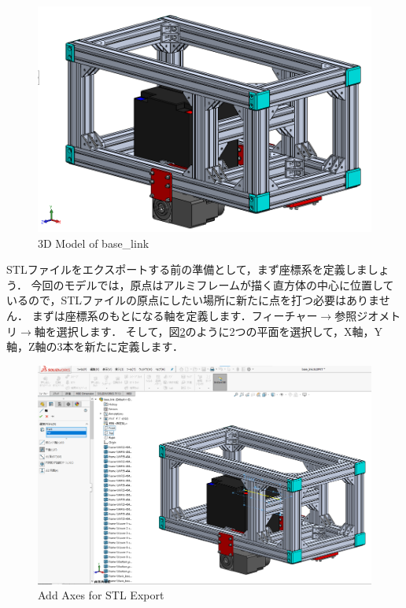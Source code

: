 \documentclass[{../../master}]{subfiles}
\begin{document}
\begin{figure}[ht]
  \centering
  \includegraphics[width=100truemm, clip]{images/base_link_cad_model.png}
  \caption{3D Model of \textsf{base\_link}}
  \label{fig:base_link_cad_model}
\end{figure}

STLファイルをエクスポートする前の準備として，まず座標系を定義しましょう．
今回のモデルでは，原点はアルミフレームが描く直方体の中心に位置しているので，STLファイルの原点にしたい場所に新たに点を打つ必要はありません．
まずは座標系のもとになる軸を定義します．フィーチャー$\rightarrow$参照ジオメトリ$\rightarrow$軸を選択します．
そして，図\ref{fig:base_link_create_axes}のように2つの平面を選択して，X軸，Y軸，Z軸の3本を新たに定義します．

\begin{figure}[ht]
  \centering
  \includegraphics[width=100truemm, clip]{images/base_link_create_axes.png}
  \caption{Add Axes for STL Export}
  \label{fig:base_link_create_axes}
\end{figure}
\end{document}
